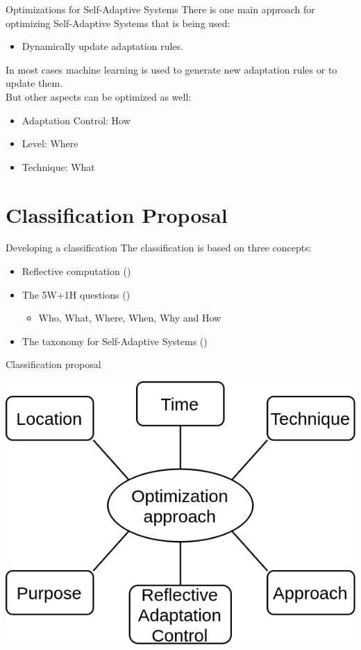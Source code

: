 \documentclass[en,16:9]{sdqbeamer}
\begin{document}
\begin{frame}{Optimizations for Self-Adaptive Systems}
	There is one main approach for optimizing Self-Adaptive Systems
	that is being used:
	\begin{itemize}
		\item Dynamically update adaptation rules.
	\end{itemize}
	\medskip
	In most cases machine learning is used to generate new adaptation rules
	or to update them. \\
	\medskip
	But other aspects can be optimized as well:
	\begin{itemize}
		\item Adaptation Control: How
		\item Level: Where
		\item Technique: What
	\end{itemize}
\end{frame}

\section{Classification Proposal}

\begin{frame}{Developing a classification}
	The classification is based on three concepts:
	\begin{itemize}
		\item Reflective computation (\cite{FORMS})
		\item The 5W+1H questions (\cite{LandscapeAndResearchChallenges})
		\begin{itemize}
			\item Who, What, Where, When, Why and How
		\end{itemize}
		\item The taxonomy for Self-Adaptive Systems (\cite{SurveyOnEngineeringApproaches})
	\end{itemize}
\end{frame}

\begin{frame}{Classification proposal}
	\begin{center}
		\includegraphics[width=.5\textwidth]{sources/ClassificationProposal-Proposal.png}
	\end{center}
\end{frame}
\end{document}
